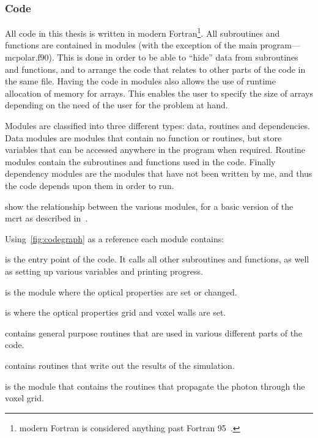 \subsubsection*{Code}

All code in this thesis is written in modern Fortran\footnote{modern Fortran is considered anything past Fortran 95~\cite{metcalf2011modern}.}.
All subroutines and functions are contained in modules (with the exception of the main program---mcpolar.f90).
This is done in order to be able to ``hide'' data from subroutines and functions, and to arrange the code that relates to other parts of the code in the same file.
Having the code in modules also allows the use of runtime allocation of memory for arrays.
This enables the user to specify the size of arrays depending on the need of the user for the problem at hand.

Modules are classified into three different types: data, routines and dependencies.
Data modules are modules that contain no function or routines, but store variables that can be accessed anywhere in the program when required.
Routine modules contain the subroutines and functions used in the code.
Finally dependency modules are the modules that have not been written by me, and thus the code depends upon them in order to run.

 show the relationship between the various modules, for a basic version of the \gls*{mcrt} as described in~.

\medskip
\indent Using~\cref{fig:codegraph} as a reference each module contains:

 is the entry point of the code. It calls all other subroutines and functions, as well as setting up various variables and printing progress.

 is the module where the optical properties are set or changed.

 is where the optical properties grid and voxel walls are set.

 contains general purpose routines that are used in various different parts of the code.

 contains routines that write out the results of the simulation.

 is the module that contains the routines that propagate the photon through the voxel grid.

